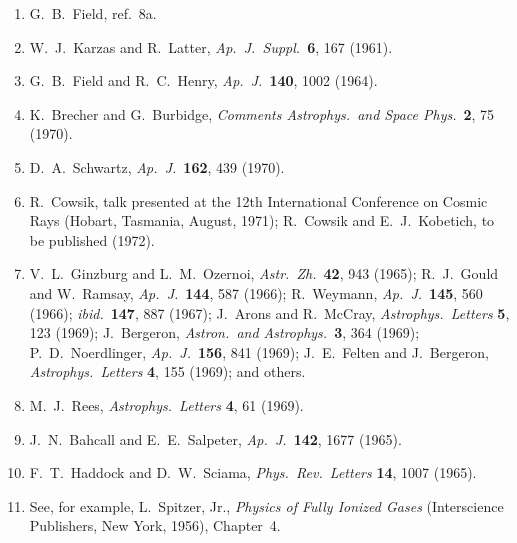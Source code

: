 \begin{enumerate}
  \item[43a.]\label{ch15-ref-43a}
  G.~B.~Field, ref.~8a.

  \item[43b.]\label{ch15-ref-43b}
  W.~J.~Karzas and R.~Latter,
  \emph{Ap.\ J.\ Suppl.}\ \textbf{6}, 167 (1961).

  \item[43c.]\label{ch15-ref-43c}
  G.~B.~Field and R.~C.~Henry,
  \emph{Ap.\ J.}\ \textbf{140}, 1002 (1964).

  \item{}\label{ch15-ref-44}
  K.~Brecher and G.~Burbidge,
  \emph{Comments Astrophys.\ and Space Phys.}\ \textbf{2}, 75 (1970).

  \item[44a.]\label{ch15-ref-44a}
  D.~A.~Schwartz, \emph{Ap.\ J.}\ \textbf{162}, 439 (1970).

  \item[44b.]\label{ch15-ref-44b}
  R.~Cowsik, talk presented at the 12th International Conference on Cosmic
  Rays (Hobart, Tasmania, August, 1971);
  R.~Cowsik and E.~J.~Kobetich, to be published (1972).

  \item{}\label{ch15-ref-45}
  V.~L.~Ginzburg and L.~M.~Ozernoi,
  \emph{Astr.\ Zh.}\ \textbf{42}, 943 (1965);
  R.~J.~Gould and W.~Ramsay, \emph{Ap.\ J.}\ \textbf{144}, 587 (1966);
  R.~Weymann, \emph{Ap.\ J.}\ \textbf{145}, 560 (1966);
  \emph{ibid.}\ \textbf{147}, 887 (1967);
  J.~Arons and R.~McCray, \emph{Astrophys.\ Letters} \textbf{5}, 123
  (1969); J.~Bergeron, \emph{Astron.\ and Astrophys.}\ \textbf{3},
  364 (1969); P.~D.~Noerdlinger, \emph{Ap.\ J.}\ \textbf{156}, 841
  (1969); J.~E.~Felten and J.~Bergeron,
  \emph{Astrophys.\ Letters} \textbf{4}, 155 (1969); and others.

  \item{}\label{ch15-ref-46}
  M.~J.~Rees, \emph{Astrophys.\ Letters} \textbf{4}, 61 (1969).

  \item{}\label{ch15-ref-47}
  J.~N.~Bahcall and E.~E.~Salpeter,
  \emph{Ap.\ J.}\ \textbf{142}, 1677 (1965).

  \item{}\label{ch15-ref-48}
  F.~T.~Haddock and D.~W.~Sciama,
  \emph{Phys.\ Rev.\ Letters} \textbf{14}, 1007 (1965).

  \item{}\label{ch15-ref-49}
  See, for example, L.~Spitzer, Jr.,
  \emph{Physics of Fully Ionized Gases}
  (Interscience Publishers, New York, 1956), Chapter~4.


\end{enumerate}
